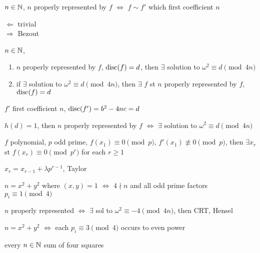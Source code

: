 \begin{lemma}
    $n \in \mathbb{N}$, $n$ properly represented by $f$ $\iff$ $f \sim f'$ which first coefficient $n$
\end{lemma}
\begin{pf}
    $\Leftarrow$ trivial\\
    $\Rightarrow$ Bezout
\end{pf}

\begin{thm}
    $n \in \mathbb{N}$,
    \begin{enumerate}
        \item $n$ properly represented by $f$, $\textnormal{disc}(f) = d$, then $\exists$ solution to $\omega^{2} \equiv d \pmod{4n}$
        \item if $\exists$ solution to $\omega^{2} \equiv d \pmod{4n}$, then $\exists$ $f$ st $n$ properly represented by $f$, $\textnormal{disc}(f) = d$
    \end{enumerate}
\end{thm}
\begin{pf}
    $f'$ first coefficient $n$, $\textnormal{disc}(f') = b^2 - 4nc = d$
\end{pf}

\begin{fact}
    $h(d) = 1$, then $n$ properly represented by $f$ $\iff$ $\exists$ solution to $\omega^{2} \equiv d \pmod{4n}$
\end{fact}

\begin{prop}
    $f$ polynomial, $p$ odd prime, $f(x_1) \equiv 0 \pmod{p}$, $f'(x_1) \not\equiv 0 \pmod{p}$, then $\exists x_r$ st $f(x_r) \equiv 0 \pmod{p^r}$ for each $r \geq 1$
\end{prop}
\begin{pf}
    $x_r = x_{r-1} + \lambda p^{r-1}$, Taylor
\end{pf}

\begin{thm}
    $n = x^2 + y^2$ where $(x, y) = 1$ $\iff$ $4 \nmid n$ and all odd prime factors $p_i \equiv 1 \pmod{4}$
\end{thm}
\begin{pf}
    $n$ properly represented $\iff$ $\exists$ sol to $\omega^2 \equiv -4 \pmod{4n}$, then CRT, Hensel
\end{pf}

\begin{cor}
    $n = x^2 + y^2$ $\iff$ each $p_i \equiv 3 \pmod{4}$ occurs to even power
\end{cor}

\begin{thm}[Langrange]
    every $n \in \mathbb{N}$ sum of four squares
\end{thm}
